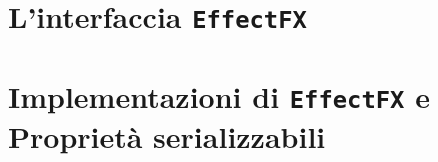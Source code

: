 

\appendix

        \chapter{L'interfaccia \texttt{EffectFX}}\label{appendix:effectfx}


        \chapter{Implementazioni di \texttt{EffectFX} e Proprietà serializzabili}\label{appendix:effectsAndProps}
